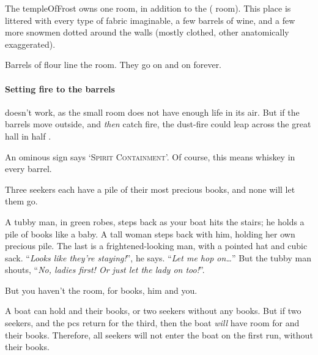 \begin{multicols}{2}
The \gls{templeOfFrost} owns one room, in addition to the  ( room).
This place is littered with every type of fabric imaginable, a few barrels of wine, and a few more snowmen dotted around the walls (mostly clothed, other anatomically exaggerated).


Barrels of flour line the room.
They go on and on forever.

\paragraph{Setting fire to the barrels}
doesn't work, as the small room does not have enough life in its air.
But if the barrels move outside, and \emph{then} catch fire, the dust-fire could leap across the great hall in half .


An ominous sign says `\textsc{Spirit Containment}'.
Of course, this means whiskey in every barrel.



Three \glspl{seeker} each have a pile of their most precious books, and none will let them go.

\begin{boxtext}
  A tubby man, in green robes, steps back as your boat hits the stairs; he holds a pile of books like a baby.
  A tall woman steps back with him, holding her own precious pile.
  The last is a frightened-looking man, with a pointed hat and cubic sack.
  ``\textit{Looks like they're staying!}'', he says.
  ``\textit{Let me hop on\ldots}''
  But the tubby man shouts, ``\textit{No, ladies first!
  Or just let the lady on too!}''.

  But you haven't the room, for books, him and you.
\end{boxtext}

A boat can hold  and their books, or two \glspl{seeker} without any books.
But if two \glspl{seeker}, and the \glspl{pc} return for the third, then the boat \emph{will} have room for  and their books.
Therefore, all \glspl{seeker} will not enter the boat on the first run, without their books.



\end{multicols}

